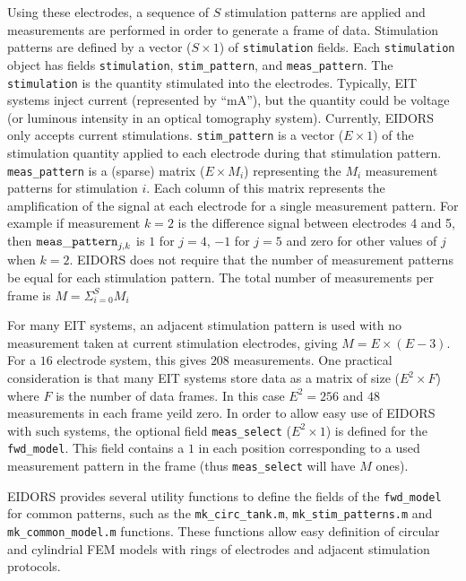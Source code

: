 \documentclass[12pt]{iopart}
\begin{document}
Using these electrodes, a sequence of $S$ stimulation
patterns are applied and measurements are performed
in order to generate a frame of data.
Stimulation patterns are defined by a vector
($S\times1$) of {\tt stimulation} fields. Each
{\tt stimulation} object has fields
{\tt stimulation}, 
{\tt stim\_pattern}, and
{\tt meas\_pattern}. The {\tt stimulation} is
the quantity stimulated into the electrodes. Typically,
EIT systems inject current (represented by ``mA''),
but the quantity could be voltage (or luminous
intensity in an optical tomography system). Currently,
EIDORS only accepts current stimulations.
{\tt stim\_pattern} is a vector ($E\times1$)
of the stimulation quantity applied to each electrode
during that stimulation pattern.
{\tt meas\_pattern} is a (sparse) matrix ($E{\times}M_i$) 
representing the $M_i$ measurement patterns for
stimulation $i$. Each column of this matrix represents
the amplification of the signal at each electrode for
a single measurement pattern. For example if measurement
$k=2$ is the difference signal between electrodes 4 and 5,
then ${\tt meas\_pattern}_{j,k}$ is $1$ for $j=4$,  $-1$
for $j=5$ and zero for other values of $j$ when $k=2$.
EIDORS does not require that the number of measurement
patterns be equal for each stimulation pattern. 
The total number of measurements per frame is
$ M = \Sigma_{i=0}^{S} M_i$

For many EIT systems, an adjacent stimulation
pattern is used with no measurement taken at current
stimulation electrodes, giving $M = E\times(E-3)$.
For a $16$ electrode system, this gives $208$
measurements. One practical consideration is that
many EIT systems store data as a matrix of size
($E^2{\times}F$) where $F$ is the number of data
frames. In this case $E^2= 256$ and $48$ measurements
in each frame yeild zero. In order to allow easy 
use of EIDORS with such systems, the optional
field {\tt meas\_select} ($E^2\times1$) is defined
for the {\tt fwd\_model}. This field contains a 
$1$ in each position corresponding to a used measurement
pattern in the frame (thus {\tt meas\_select} will
have $M$ ones).

EIDORS provides several utility functions to define
the fields of the {\tt fwd\_model} for common 
patterns, such as the
{\tt mk\_circ\_tank.m},
{\tt mk\_stim\_patterns.m} and
{\tt mk\_common\_model.m} functions. These functions
allow easy definition of circular and cylindrial
FEM models with rings of electrodes and adjacent
stimulation protocols.
\end{document}
